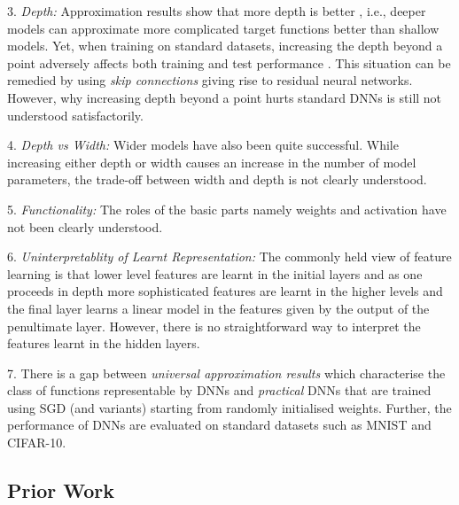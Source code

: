\documentclass{article}
\begin{document}
3. \emph{Depth:} Approximation results show that more depth is better \cite{depth1,depth2}, i.e., deeper models can approximate more complicated target functions better than shallow models. Yet, when training on standard datasets, increasing the depth beyond a point adversely affects both training and test performance \cite{resnets}. This situation can be remedied by using \emph{skip connections} giving rise to residual neural networks. However, why increasing depth beyond a point hurts standard DNNs is still not understood satisfactorily. 

4. \emph{Depth vs Width:} Wider models \cite{wide1,wide2,wide3} have also been quite successful. While increasing either depth or width causes an increase in the number of model parameters, the trade-off between width and depth is not clearly understood.

5. \emph{Functionality:} The roles of the basic parts namely weights and activation have not been clearly understood.

6. \emph{Uninterpretablity of Learnt Representation:} The commonly held view of feature learning is that lower level features are learnt in the initial layers and as one proceeds in depth more sophisticated features are learnt in the higher levels and the final layer learns a linear model in the features given by the output of the penultimate layer. However, there is no straightforward way to interpret the features learnt in the hidden layers.

7. There is a gap between \emph{universal approximation results} which characterise the class of functions representable by DNNs and \emph{practical} DNNs that are trained using SGD (and variants) starting from randomly initialised weights. Further, the performance of DNNs are evaluated on standard datasets such as MNIST and CIFAR-10. 

\subsection{Prior Work}
\end{document}
